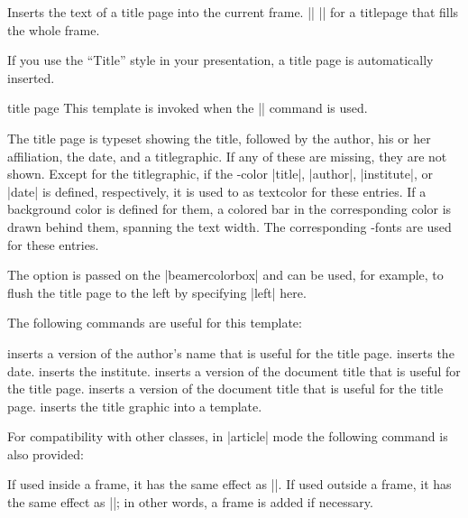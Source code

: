\begin{command}{\titlepage}
  Inserts the text of a title page into the current frame.
  \example
  |\frame{\titlepage}|
  \example
  |\frame[plain]{\titlepage}| for a titlepage that fills the whole frame.

  \lyxnote
  If you use the ``Title'' style in your presentation, a title page is automatically inserted.

  \begin{element}{title page}\yes\yes\yes
    This template is invoked when the |\titlepage| command is used.

    \begin{templateoptions}
      The title page is typeset showing the title, followed by the author, his or her affiliation, the date, and a titlegraphic. If any of these are missing, they are not shown. Except for the titlegraphic, if the \beamer-color |title|, |author|, |institute|, or |date| is defined, respectively, it is used to as textcolor for these entries. If a background color is defined for them, a colored bar in the corresponding color is drawn behind them, spanning the text width. The corresponding \beamer-fonts are used for these entries.

      The  option is passed on the |beamercolorbox| and can be used, for example, to flush the title page to the left by specifying |left| here.
    \end{templateoptions}

    The following commands are useful for this template:
    \begin{templateinserts}
      \iteminsert{\insertauthor} inserts a version of the author's name that is useful for the title page.
      \iteminsert{\insertdate} inserts the date.
      \iteminsert{\insertinstitute} inserts the institute.
      \iteminsert{\inserttitle} inserts a version of the document title that is useful for the title page.
      \iteminsert{\insertsubtitle} inserts a version of the document title that is useful for the title page.
      \iteminsert{\inserttitlegraphic} inserts the title graphic into a template.
    \end{templateinserts}
  \end{element}
\end{command}

For compatibility with other classes, in |article| mode the following command is also provided:

\begin{command}{\maketitle}
  \beamernote
  If used inside a frame, it has the same effect as |\titlepage|. If used outside a frame, it has the same effect as |\frame{\titlepage}|; in other words, a frame is added if necessary.
\end{command}

